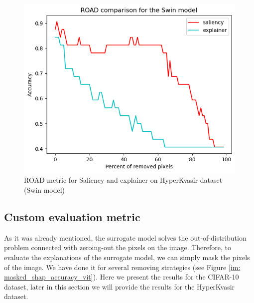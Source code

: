 \documentclass[magisterska,en]{pracamgr}
\begin{document}
\begin{figure}[H]
\centering
\includegraphics[scale=0.5]{./images/ROAD_gastro_swin.png}
\caption{ROAD metric for Saliency and explainer on HyperKvasir dataset (Swin model)}
\label{ROAD_gastro_swin}
\end{figure}










\subsection{Custom evaluation metric}

As it was already mentioned, the surrogate model solves the out-of-distribution problem connected with zeroing-out the pixels on the image. Therefore, to evaluate the explanations of the surrogate model, we can simply mask the pixels of the image. We have done it for several removing strategies (see Figure \ref{im: masked_shap_accuracy_vit}). Here we present the results for the CIFAR-10 dataset, later in this section we will provide the results for the HyperKvasir dataset.


\end{document}
